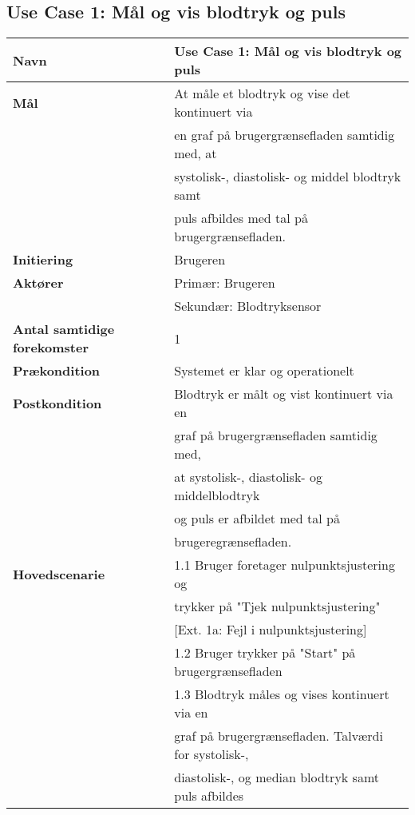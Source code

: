 \subsection{Use Case 1: Mål og vis blodtryk og puls}
\vspace{0.5 cm}
\begin{table}[h!]
	\begin{tabular}{l|l}
		\rowcolor[HTML]{A9D9F9} 
		\textbf{Navn} & Use Case 1: Mål og vis blodtryk og puls \\ \hline
		\textbf{Mål} & At måle et blodtryk og vise det kontinuert via \\
		& en graf på brugergrænsefladen samtidig med, at \\
		& systolisk-, diastolisk- og middel blodtryk samt \\
		& puls afbildes med tal på brugergrænsefladen. \\ \hline
		\rowcolor[HTML]{A9D9F9} 
		\textbf{Initiering} & Brugeren \\ \hline
		\textbf{Aktører} & Primær: Brugeren \\
		& Sekundær: Blodtryksensor \\ \hline
		\rowcolor[HTML]{A9D9F9} 
		\textbf{Antal samtidige forekomster} & 1 \\ \hline
		\textbf{Prækondition} & Systemet er klar og operationelt \\ \hline
		\rowcolor[HTML]{A9D9F9} 
		\textbf{Postkondition} & Blodtryk er målt og vist kontinuert via en \\
		\rowcolor[HTML]{A9D9F9} 
		& graf på brugergrænsefladen samtidig med, \\
		\rowcolor[HTML]{A9D9F9} 
		& at systolisk-, diastolisk- og middelblodtryk \\
		\rowcolor[HTML]{A9D9F9} 
		& og puls er afbildet med tal på \\
		\rowcolor[HTML]{A9D9F9} 
		& brugeregrænsefladen. \\ \hline
		\textbf{Hovedscenarie} & 1.1 Bruger foretager nulpunktsjustering og \\
		& trykker på "Tjek nulpunktsjustering" \\
		& {[}Ext. 1a: Fejl i nulpunktsjustering{]} \\
		& 1.2 Bruger trykker på "Start" på brugergrænsefladen \\
		& 1.3 Blodtryk måles og vises kontinuert via en \\
		& graf på brugergrænsefladen. Talværdi for systolisk-, \\
		& diastolisk-, og median blodtryk samt puls afbildes \\

\end{tabular}
\end{table}
